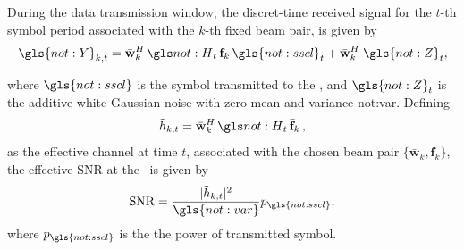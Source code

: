During the data transmission window, the discret-time received signal for the $t$-th symbol period associated with the $k$-th fixed beam pair, is given by
\begin{equation}
\label{eq.:amc-rx-signal}
	\gls{not:Y}_{k,t} =
    \bar{\mathbf{w}}^H_k \,
  \channel _t\,
   \bar{\mathbf{f}}_k \,
   \gls{not:sscl}_t
 +
  \bar{\mathbf{w}}^H_k \;
  \gls{not:Z}_t,
\end{equation}

\noindent where $\gls{not:sscl}$ is the symbol transmitted to the \ue, and $\gls{not:Z}_t$ is the additive white Gaussian noise with zero mean and variance \gls{not:var}.
%
%
Defining
\begin{equation}
  \tilde{h}_{k,t} =     \bar{\mathbf{w}}^H_k \,
  \channel _t\,
   \bar{\mathbf{f}}_k \, ,
\end{equation}
as the effective channel at time $t$, associated with the chosen beam pair $\{ \bar{\mathbf{w}}_k, \bar{\mathbf{f}}_k \}$, the effective SNR at the \ue \, is given by
%
\begin{equation}
    \label{eq.:amc-snr}
    \textrm{SNR} = \frac{ \abs{
     \tilde{h}_{k,t}
      }^2 }{\gls{not:var}} p_{\gls{not:sscl}},
\end{equation}
where $p_{\gls{not:sscl}}$ is the the power of transmitted symbol.
%
%


